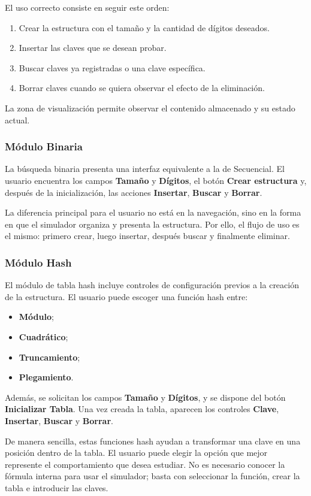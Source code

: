 \documentclass[10pt,onecolumn]{IEEEtran}
\begin{document}
El uso correcto consiste en seguir este orden:
\begin{enumerate}
  \item Crear la estructura con el tamaño y la cantidad de dígitos deseados.
  \item Insertar las claves que se desean probar.
  \item Buscar claves ya registradas o una clave específica.
  \item Borrar claves cuando se quiera observar el efecto de la eliminación.
\end{enumerate}

La zona de visualización permite observar el contenido almacenado y su estado actual.

\subsubsection{Módulo Binaria}
La búsqueda binaria presenta una interfaz equivalente a la de Secuencial. El usuario encuentra los campos \textbf{Tamaño} y \textbf{Dígitos}, el botón \textbf{Crear estructura} y, después de la inicialización, las acciones \textbf{Insertar}, \textbf{Buscar} y \textbf{Borrar}.

La diferencia principal para el usuario no está en la navegación, sino en la forma en que el simulador organiza y presenta la estructura. Por ello, el flujo de uso es el mismo: primero crear, luego insertar, después buscar y finalmente eliminar.

\subsubsection{Módulo Hash}
El módulo de tabla hash incluye controles de configuración previos a la creación de la estructura. El usuario puede escoger una función hash entre:
\begin{itemize}
  \item \textbf{Módulo};
  \item \textbf{Cuadrático};
  \item \textbf{Truncamiento};
  \item \textbf{Plegamiento}.
\end{itemize}

Además, se solicitan los campos \textbf{Tamaño} y \textbf{Dígitos}, y se dispone del botón \textbf{Inicializar Tabla}. Una vez creada la tabla, aparecen los controles \textbf{Clave}, \textbf{Insertar}, \textbf{Buscar} y \textbf{Borrar}.

De manera sencilla, estas funciones hash ayudan a transformar una clave en una posición dentro de la tabla. El usuario puede elegir la opción que mejor represente el comportamiento que desea estudiar. No es necesario conocer la fórmula interna para usar el simulador; basta con seleccionar la función, crear la tabla e introducir las claves.
\end{document}
